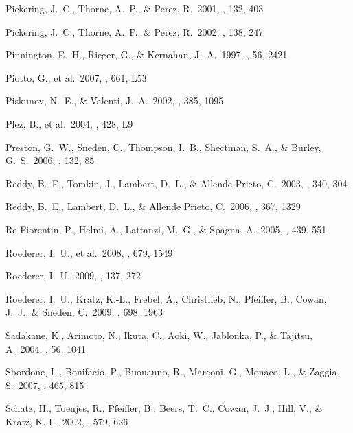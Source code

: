 \documentclass{emulateapj}
\begin{document}
\begin{thebibliography}{}

 Pickering, J.~C., 
Thorne, A.~P., \& Perez, R.\ 2001, \apjs, 132, 403 

 Pickering, J.~C., 
Thorne, A.~P., \& Perez, R.\ 2002, \apjs, 138, 247 

 Pinnington, E.~H., 
Rieger, G., \& Kernahan, J.~A.\ 1997, \pra, 56, 2421 

 Piotto, G., et al.\ 
2007, \apjl, 661, L53 

 Piskunov, N.~E., \& 
Valenti, J.~A.\ 2002, \aap, 385, 1095 

 Plez, B., et al.\ 2004, \aap, 428, L9 

 Preston, G.~W., Sneden, 
C., Thompson, I.~B., Shectman, S.~A., \& Burley, G.~S.\ 2006, \aj, 132, 85 

 Reddy, B.~E., Tomkin, J., 
Lambert, D.~L., \& Allende Prieto, C.\ 2003, \mnras, 340, 304 

 Reddy, B.~E., Lambert, 
D.~L., \& Allende Prieto, C.\ 2006, \mnras, 367, 1329 

 Re Fiorentin, P., 
Helmi, A., Lattanzi, M.~G., \& Spagna, A.\ 2005, \aap, 439, 551 

 Roederer, I.~U., et 
al.\ 2008, \apj, 679, 1549 

 Roederer, I.~U.\ 2009, \aj, 137, 272 

 Roederer, I.~U., 
Kratz, K.-L., Frebel, A., Christlieb, N., Pfeiffer, B., Cowan, J.~J., 
\& Sneden, C.\ 2009, \apj, 698, 1963 

 Sadakane, K., Arimoto, 
N., Ikuta, C., Aoki, W., Jablonka, P., 
\& Tajitsu, A.\ 2004, \pasj, 56, 1041 

 Sbordone, L., Bonifacio, P., 
Buonanno, R., Marconi, G., Monaco, L., \& Zaggia, S.\ 2007, \aap, 465, 815 

 Schatz, H., Toenjes, R., 
Pfeiffer, B., Beers, T.~C., Cowan, J.~J., Hill, V., 
\& Kratz, K.-L.\ 2002, \apj, 579, 626 


\end{thebibliography}
\end{document}
